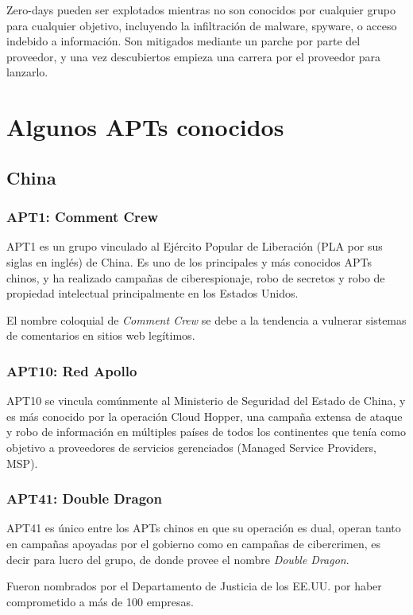 \documentclass{article}
\begin{document}
Zero-days pueden ser explotados mientras no son conocidos por cualquier grupo para cualquier objetivo, incluyendo la infiltración de malware, spyware, o acceso indebido a información. Son mitigados mediante un parche por parte del proveedor, y una vez descubiertos empieza una carrera por el proveedor para lanzarlo. \autocite{symantec-zeroday}


\section{Algunos APTs conocidos}
\subsection{China}
\subsubsection{APT1: Comment Crew}
APT1 es un grupo vinculado al Ejército Popular de Liberación (PLA por sus siglas en inglés) de China. Es uno de los principales y más conocidos APTs chinos, y ha realizado campañas de ciberespionaje, robo de secretos y robo de propiedad intelectual principalmente en los Estados Unidos.

El nombre coloquial de {\it Comment Crew} se debe a la tendencia a vulnerar sistemas de comentarios en sitios web legítimos. \autocite{bbc-comment-crew}

\subsubsection{APT10: Red Apollo}
APT10 se vincula comúnmente al Ministerio de Seguridad del Estado de China, y es más conocido por la operación Cloud Hopper, una campaña extensa de ataque y robo de información en múltiples países de todos los continentes que tenía como objetivo a proveedores de servicios gerenciados (Managed Service Providers, MSP). \autocite{trendmicro-cloud-hopper}

\subsubsection{APT41: Double Dragon}
APT41 es único entre los APTs chinos en que su operación es dual, operan tanto en campañas apoyadas por el gobierno como en campañas de cibercrimen, es decir para lucro del grupo, de donde provee el nombre {\it Double Dragon}.

Fueron nombrados por el Departamento de Justicia de los EE.UU. por haber comprometido a más de 100 empresas. \autocite{zdnet-apt41}
\end{document}
